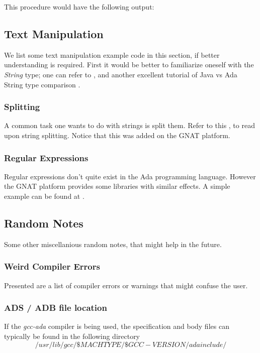 This procedure would have the following output:


\subsection{Text Manipulation}
We list some text manipulation example code in this section, if better understanding is required. First it would be better to familiarize oneself with the \textit{String} type; one can refer to \cite{AdaStringType}, and another excellent tutorial of Java vs Ada String type comparison \cite{AdaStringVersusJavaString}.

\subsubsection{Splitting}
A common task one wants to do with strings is split them. Refer to this \cite{AdaStringSplit}, to read upon string splitting. Notice that this was added on the GNAT platform.

\subsubsection{Regular Expressions}
Regular expressions don't quite exist in the Ada programming language. However the GNAT platform provides some libraries with similar effects. A simple example can be found at \cite{AdaRegularExpressions}.


\subsection{Random Notes}
Some other miscellanious random notes, that might help in the future. 

\subsubsection{Weird Compiler Errors}
Presented are a list of compiler errors or warnings that might confuse the user. 

\paragraph{} 

\subsubsection{ADS / ADB file location}
If the \textit{gcc-ada} compiler is being used, the specification and body files can typically be found in the following directory
$$ /usr/lib/gcc/\$MACHTYPE/\$GCC-VERSION/adainclude/ $$


